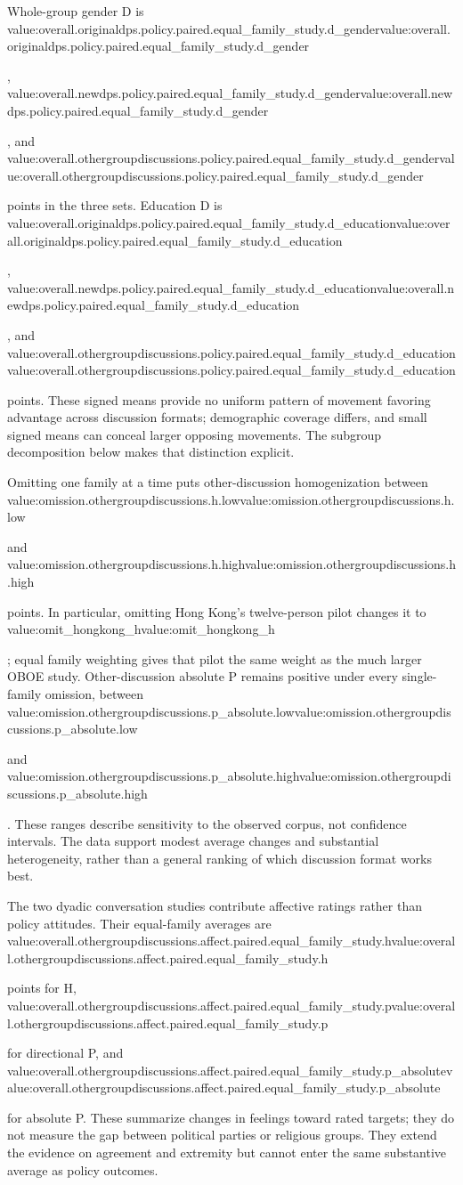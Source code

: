 \documentclass[11pt]{article}
\newcommand{\valueof}[1]{\ifcsname value:#1\endcsname\csname value:#1\endcsname\else\PackageError{oos}{Missing generated value #1}{Run make oos-paper}\fi}
\newcommand{\overall}[3]{\valueof{overall.#1.policy.paired.#2.#3}}
\begin{document}
Whole-group gender D is
\overall{originaldps}{equal_family_study}{d_gender},
\overall{newdps}{equal_family_study}{d_gender}, and
\overall{othergroupdiscussions}{equal_family_study}{d_gender} points in the three
sets. Education D is
\overall{originaldps}{equal_family_study}{d_education},
\overall{newdps}{equal_family_study}{d_education}, and
\overall{othergroupdiscussions}{equal_family_study}{d_education} points.
These signed means provide no uniform pattern of movement favoring advantage
across discussion formats; demographic coverage differs, and small signed means
can conceal larger opposing movements. The subgroup decomposition below makes
that distinction explicit.

Omitting one family at a time puts other-discussion homogenization between
\valueof{omission.othergroupdiscussions.h.low} and
\valueof{omission.othergroupdiscussions.h.high} points. In particular, omitting
Hong Kong's twelve-person pilot changes it to \valueof{omit_hongkong_h}; equal
family weighting gives that pilot the same weight as the much larger OBOE study.
Other-discussion absolute P remains positive under every single-family omission,
between \valueof{omission.othergroupdiscussions.p_absolute.low} and
\valueof{omission.othergroupdiscussions.p_absolute.high}. These ranges describe
sensitivity to the observed corpus, not confidence intervals. The data support
modest average changes and substantial heterogeneity, rather than a general
ranking of which discussion format works best.

The two dyadic conversation studies contribute affective ratings rather than
policy attitudes. Their equal-family averages are
\valueof{overall.othergroupdiscussions.affect.paired.equal_family_study.h} points
for H,
\valueof{overall.othergroupdiscussions.affect.paired.equal_family_study.p} for
directional P, and
\valueof{overall.othergroupdiscussions.affect.paired.equal_family_study.p_absolute}
for absolute P. These summarize changes in feelings toward rated targets;
they do not measure the gap between political parties or religious groups.
They extend the evidence on agreement and extremity but cannot enter the
same substantive average as policy outcomes.
\end{document}
